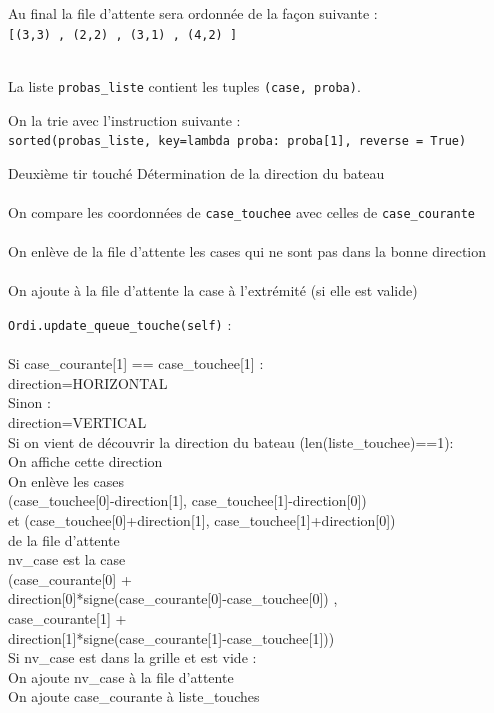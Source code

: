 \begin{frame}
Au final la file d'attente sera ordonnée de la façon suivante :\\
\texttt{[(3,3) , (2,2) , (3,1) , (4,2) ]}\\~\\  \pause

La liste \texttt{probas\_liste} contient les tuples \texttt{(case, proba)}.\\  \pause

On la trie avec l'instruction suivante :\\
\texttt{sorted(probas\_liste, key=lambda proba: proba[1], reverse = True)}
\end{frame}


\begin{frame}{Deuxième tir touché}
Détermination de la direction du bateau\\~\\  \pause
On compare les coordonnées de \texttt{case\_touchee} avec celles de \texttt{case\_courante}\\~\\ \pause
On enlève de la file d'attente les cases qui ne sont pas dans la bonne direction\\~\\ \pause
On ajoute à la file d'attente la case à l'extrémité (si elle est valide)
\end{frame}

{
\begin{frame}[allowframebreaks]
\texttt{Ordi.update\_queue\_touche(self)} :\\~\\

Si case\_courante[1] == case\_touchee[1] :\\
direction=HORIZONTAL\\
Sinon :\\
direction=VERTICAL\\
Si on vient de découvrir la direction du bateau (len(liste\_touchee)==1):\\
On affiche cette direction\\
On enlève les cases \\
 (case\_touchee[0]-direction[1], case\_touchee[1]-direction[0])\\ 
et (case\_touchee[0]+direction[1], case\_touchee[1]+direction[0])\\
de la file d'attente\\
\framebreak
nv\_case est la case\\
(case\_courante[0] +\\
 direction[0]*signe(case\_courante[0]-case\_touchee[0]) ,\\
 case\_courante[1] +\\
 direction[1]*signe(case\_courante[1]-case\_touchee[1]))\\
Si nv\_case est dans la grille et est vide :\\
On ajoute nv\_case à la file d'attente\\
On ajoute case\_courante à liste\_touches\\
\end{frame}
}

